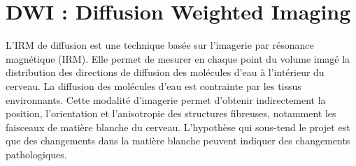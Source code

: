 \section{DWI : Diffusion Weighted Imaging} \label{sec:dwi}

L'IRM de diffusion est une technique basée sur l'imagerie par résonance magnétique (IRM).
Elle permet de mesurer en chaque point du volume imagé la distribution des directions de diffusion des molécules d'eau à l'intérieur du cerveau.
La diffusion des molécules d'eau est contrainte par les tissus environnants. Cette modalité d'imagerie permet d'obtenir indirectement la position, l'orientation et l'anisotropie des structures fibreuses, notamment les faisceaux de matière blanche du cerveau.
L'hypothèse qui sous-tend le projet est que des changements dans la matière blanche peuvent indiquer des changements pathologiques.

